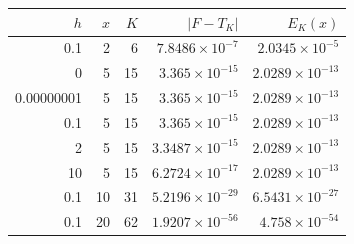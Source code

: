 \begin{tabular}{rrrrr}
\toprule
$h$ & $x$ & $K$ & $|F-T_K|$ & $E_K(x)$ \\
\midrule
0.1 & 2 & 6 & $7.8486\times10^{-7}$ & $2.0345\times10^{-5}$ \\
0 & 5 & 15 & $3.365\times10^{-15}$ & $2.0289\times10^{-13}$ \\
0.00000001 & 5 & 15 & $3.365\times10^{-15}$ & $2.0289\times10^{-13}$ \\
0.1 & 5 & 15 & $3.365\times10^{-15}$ & $2.0289\times10^{-13}$ \\
2 & 5 & 15 & $3.3487\times10^{-15}$ & $2.0289\times10^{-13}$ \\
10 & 5 & 15 & $6.2724\times10^{-17}$ & $2.0289\times10^{-13}$ \\
0.1 & 10 & 31 & $5.2196\times10^{-29}$ & $6.5431\times10^{-27}$ \\
0.1 & 20 & 62 & $1.9207\times10^{-56}$ & $4.758\times10^{-54}$ \\
\bottomrule
\end{tabular}
